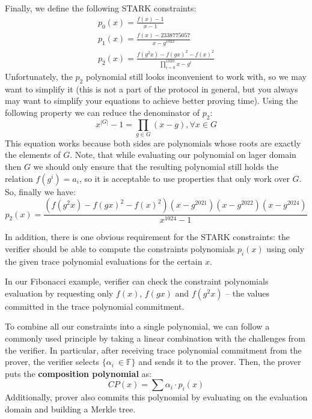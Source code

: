 \documentclass[../lecture-notes.tex]{subfiles}
\begin{document}
\begin{example}
Finally, we define the following STARK constraints:
\begin{gather*}
    p_0(x) = \frac{f(x)-1}{x - 1} \\
    p_1(x) = \frac{f(x) - 2338775057}{x - g^{1022}} \\
    p_2(x) = \frac{f(g^2x) - f(gx)^2 - f(x)^2}{\prod_{i=0}^{1020} x - g^i}
\end{gather*}
Unfortunately, the $p_2$ polynomial still looks inconvenient to work with, so we may want to simplify it (this is not a part of the protocol in general, but you always may want to simplify your equations to achieve better proving time). Using the following property we can reduce the denominator of $p_2$:
\begin{equation*}
x^{|G|} - 1 = \prod_{g \in G}(x-g), \forall x \in G  
\end{equation*}
This equation works because both sides are polynomials whose roots are exactly the elements of $G$. Note, that while evaluating our polynomial on lager domain then $G$ we should only ensure that the resulting polynomial still holds the relation $f(g^i) = a_i$, so it is acceptable to use properties that only work over $G$. So, finally we have:
\begin{equation*}
p_2(x) = \frac{(f(g^2x) - f(gx)^2 - f(x)^2)(x - g^{2021})(x - g^{2022})(x - g^{2024})}{x^{1024} - 1}  
\end{equation*}
\end{example}

In addition, there is one obvious requirement for the STARK constraints: the verifier should be able to compute the constraints polynomials $p_i(x)$ using only the given trace polynomial evaluations for the certain $x$.

\begin{example}
In our Fibonacci example, verifier can check the constraint polynomials evaluation by requesting only $f(x)$, $f(gx)$ and $f(g^2x)$ -- the values committed in the trace polynomial commitment.
\end{example}

To combine all our constraints into a single polynomial, we can follow a commonly used principle by taking a linear combination with the challenges from the verifier. In particular, after receiving trace polynomial commitment from the prover, the verifier selects $\{\alpha_i\ \in \mathbb{F}\}$ and sends it to the prover. Then, the prover puts the \textbf{composition polynomial} as:
\begin{equation*}
CP(x) = \sum \alpha_i\cdot p_i(x)
\end{equation*}
Additionally, prover also commits this polynomial by evaluating on the evaluation domain and building a Merkle tree.
\end{document}
